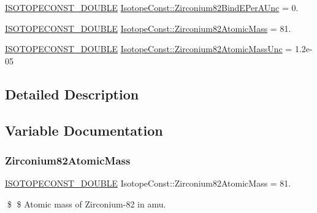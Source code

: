 \begin{DoxyCompactItemize}
\mbox{\hyperlink{group___isotope_const-_macros_ga8f45a7272ce02c0b4c65c44636ed719a}{I\+S\+O\+T\+O\+P\+E\+C\+O\+N\+S\+T\+\_\+\+D\+O\+U\+B\+LE}} \mbox{\hyperlink{group___isotope_const-_zirconium-_zr82_gaf313036e3b26ca0d67d53cb84836bc98}{Isotope\+Const\+::\+Zirconium82\+Bind\+E\+Per\+A\+Unc}} = 0.
\item 
\mbox{\hyperlink{group___isotope_const-_macros_ga8f45a7272ce02c0b4c65c44636ed719a}{I\+S\+O\+T\+O\+P\+E\+C\+O\+N\+S\+T\+\_\+\+D\+O\+U\+B\+LE}} \mbox{\hyperlink{group___isotope_const-_zirconium-_zr82_ga5f0671647ddc5eb4b3d160c53b14b60f}{Isotope\+Const\+::\+Zirconium82\+Atomic\+Mass}} = 81.
\item 
\mbox{\hyperlink{group___isotope_const-_macros_ga8f45a7272ce02c0b4c65c44636ed719a}{I\+S\+O\+T\+O\+P\+E\+C\+O\+N\+S\+T\+\_\+\+D\+O\+U\+B\+LE}} \mbox{\hyperlink{group___isotope_const-_zirconium-_zr82_ga0e8a1fe56a1c68921047f7657a03a092}{Isotope\+Const\+::\+Zirconium82\+Atomic\+Mass\+Unc}} = 1.\+2e-\/05
\end{DoxyCompactItemize}


\subsection{Detailed Description}


\subsection{Variable Documentation}
\mbox{\label{group___isotope_const-_zirconium-_zr82_ga5f0671647ddc5eb4b3d160c53b14b60f}} 
\subsubsection{\texorpdfstring{Zirconium82\+Atomic\+Mass}{Zirconium82AtomicMass}}
{\footnotesize\ttfamily \mbox{\hyperlink{group___isotope_const-_macros_ga8f45a7272ce02c0b4c65c44636ed719a}{I\+S\+O\+T\+O\+P\+E\+C\+O\+N\+S\+T\+\_\+\+D\+O\+U\+B\+LE}} Isotope\+Const\+::\+Zirconium82\+Atomic\+Mass = 81.}

\$ \$ Atomic mass of Zirconium-\/82 in amu. \mbox{\label{group___isotope_const-_zirconium-_zr82_ga0e8a1fe56a1c68921047f7657a03a092}} 
